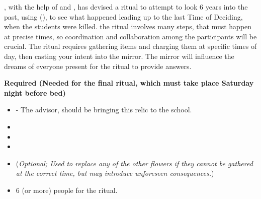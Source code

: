 \documentclass[green]{GL2020}
\begin{document}
\name{\gWhatHappenedSixYearsAgo{}}

\cPresident{}, with the help of \cLibAssist{} and \cHeir{}, has devised a ritual to attempt to look 6 years into the past, using \iMirror{\MYname} (\iMirror{\MYnumber}),  to see what happened leading up to the last Time of Deciding, when the students were killed. the ritual involves many steps, that must happen at precise times, so coordination and collaboration among the participants will be crucial. The ritual requires gathering items and charging them at specific times of day, then casting your intent into the mirror. The mirror will influence the dreams of everyone present for the ritual to provide answers.

\textbf{Required (Needed for the final ritual, which must take place Saturday night before bed)}
\begin{itemize}
  \item \iMirror{} - The \pTech{} advisor, \cDiplomat{\full} should be bringing this relic to the school.
  \item \iMorningGlory{}
  \item \iLily{}
  \item \iMoonflower{}
  \item \iStoneFlower{} (\emph{Optional; Used to replace any of the other flowers if they cannot be gathered at the correct time, but may introduce unforeseen consequences.})
  \item 6 (or more) people for the ritual.
\end{itemize}
\end{document}
